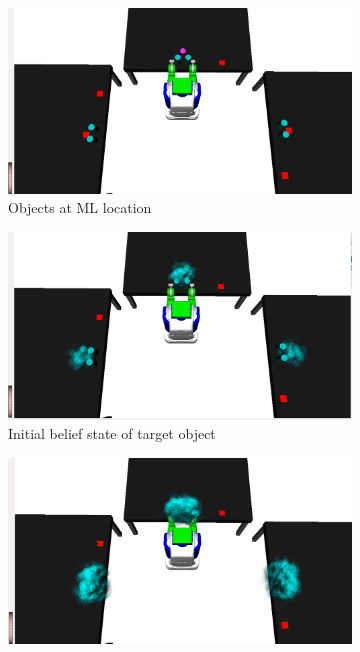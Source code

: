 \begin{figure}
  \centering
  \begin{subfigure}[b]{0.3\linewidth}
    \includegraphics[width=\textwidth]{drawer_images/init_state.png}
    \caption{Objects at ML location}
    \label{fig:step1}
  \end{subfigure}
  \begin{subfigure}[b]{0.3\linewidth}
    \includegraphics[width=\textwidth]{drawer_images/initial_object.png}
    \caption{Initial belief state of target object}
    \label{fig:step2}
  \end{subfigure}
  \begin{subfigure}[b]{0.3\linewidth}
    \includegraphics[width=\textwidth]{drawer_images/initial_obstructions.png}

\end{subfigure}
\end{figure}
